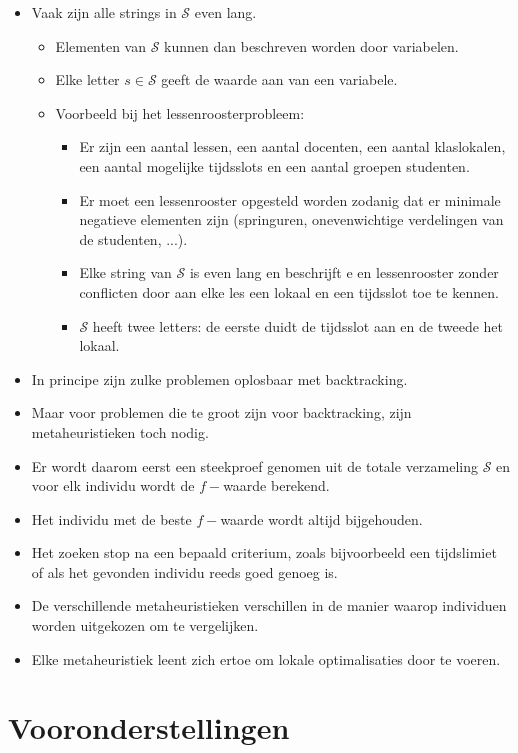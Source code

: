 \begin{itemize}
    \item Vaak zijn alle strings in $\mathcal{S}$ even lang.
    \begin{itemize}
        \item Elementen van $\mathcal{S}$ kunnen dan beschreven worden door variabelen.
        \item Elke letter $s \in \mathcal{S}$ geeft de waarde aan van een variabele.
        \item Voorbeeld bij het lessenroosterprobleem:
        \begin{itemize}
            \item Er zijn een aantal lessen, een aantal docenten, een aantal klaslokalen, een aantal mogelijke tijdsslots en een aantal groepen studenten.
            \item Er moet een lessenrooster opgesteld worden zodanig dat er minimale negatieve elementen zijn (springuren, onevenwichtige verdelingen van de studenten, ...).
            \item Elke string van $\mathcal{S}$ is even lang en beschrijft e en lessenrooster zonder conflicten door aan elke les een lokaal en een tijdsslot toe te kennen.
            \item $\mathcal{S}$ heeft twee letters: de eerste duidt de tijdsslot aan en de tweede het lokaal.
        \end{itemize}
    \end{itemize}
    \item In principe zijn zulke problemen oplosbaar met backtracking.
    \item Maar voor problemen die te groot zijn voor backtracking, zijn metaheuristieken toch nodig.
    \item Er wordt daarom eerst een steekproef genomen uit de totale verzameling $\mathcal{S}$ en voor elk individu wordt de $f-$waarde berekend.
    \item Het individu met de beste $f-$waarde wordt altijd bijgehouden.
    \item Het zoeken stop na een bepaald criterium, zoals bijvoorbeeld een tijdslimiet of als het gevonden individu reeds goed genoeg is.
    \item De verschillende metaheuristieken verschillen in de manier waarop individuen worden uitgekozen om te vergelijken.
    \item Elke metaheuristiek leent zich ertoe om lokale optimalisaties door te voeren.
\end{itemize}


\section{Vooronderstellingen}

